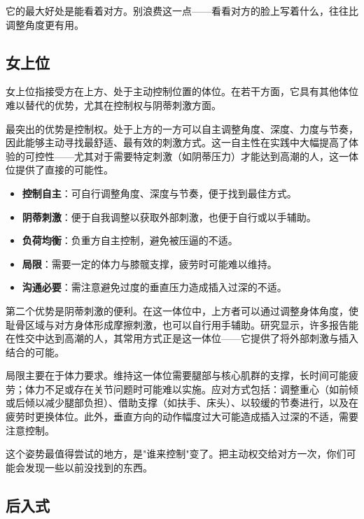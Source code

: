 \documentclass[12pt,UTF8]{ctexbook}
\newcommand{\keyword}[1]{\textbf{#1}}
\begin{document}
\begin{tcolorbox}[colback=pink!5!white,colframe=red!50!black,title=贴心小叮咛]
它的最大好处是能看着对方。别浪费这一点——看看对方的脸上写着什么，往往比调整角度更有用。
\end{tcolorbox}
\subsection{女上位}

女上位指接受方在上方、处于主动控制位置的体位。在若干方面，它具有其他体位难以替代的优势，尤其在控制权与阴蒂刺激方面。

最突出的优势是控制权。处于上方的一方可以自主调整角度、深度、力度与节奏，因此能够主动寻找最舒适、最有效的刺激方式。这一自主性在实践中大幅提高了体验的可控性——尤其对于需要特定刺激（如阴蒂压力）才能达到高潮的人，这一体位提供了直接的可能性。

\begin{itemize}
  \item \keyword{控制自主}：可自行调整角度、深度与节奏，便于找到最佳方式。
  \item \keyword{阴蒂刺激}：便于自我调整以获取外部刺激，也便于自行或以手辅助。
  \item \keyword{负荷均衡}：负重方自主控制，避免被压逼的不适。
  \item \keyword{局限}：需要一定的体力与膝髋支撑，疲劳时可能难以维持。
  \item \keyword{沟通必要}：需注意避免过度的垂直压力造成插入过深的不适。
\end{itemize}

第二个优势是阴蒂刺激的便利。在这一体位中，上方者可以通过调整身体角度，使耻骨区域与对方身体形成摩擦刺激，也可以自行用手辅助。研究显示，许多报告能在性交中达到高潮的人，其常用方式正是这一体位——它提供了将外部刺激与插入结合的可能。

局限主要在于体力要求。维持这一体位需要腿部与核心肌群的支撑，长时间可能疲劳；体力不足或存在关节问题时可能难以实施。应对方式包括：调整重心（如前倾或后倾以减少腿部负担）、借助支撑（如扶手、床头）、以较缓的节奏进行，以及在疲劳时更换体位。此外，垂直方向的动作幅度过大可能造成插入过深的不适，需要注意控制。

\begin{tcolorbox}[colback=pink!5!white,colframe=red!50!black,title=贴心小叮咛]
这个姿势最值得尝试的地方，是"谁来控制"变了。把主动权交给对方一次，你们可能会发现一些以前没找到的东西。
\end{tcolorbox}
\subsection{后入式}
\end{document}
